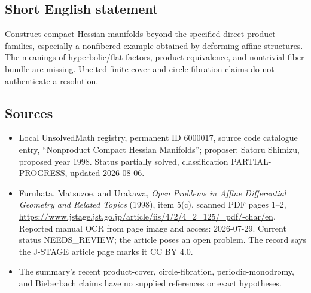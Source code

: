 \documentclass[11pt]{article}
\begin{document}
\subsection{Short English statement}
Construct compact Hessian manifolds beyond the specified direct-product families, especially a nonfibered example obtained by deforming affine structures. The meanings of hyperbolic/flat factors, product equivalence, and nontrivial fiber bundle are missing. Uncited finite-cover and circle-fibration claims do not authenticate a resolution.
\subsection{Sources}
\begin{itemize}
\item Local UnsolvedMath registry, permanent ID 6000017, source code catalogue entry, ``Nonproduct Compact Hessian Manifolds''; proposer: Satoru Shimizu, proposed year 1998. Status partially solved, classification PARTIAL-PROGRESS, updated 2026-08-06.
\item Furuhata, Matsuzoe, and Urakawa, \emph{Open Problems in Affine Differential Geometry and Related Topics} (1998), item 5(c), scanned PDF pages 1--2, \url{https://www.jstage.jst.go.jp/article/iis/4/2/4_2_125/_pdf/-char/en}. Reported manual OCR from page image and access: 2026-07-29. Current status NEEDS\_REVIEW; the article poses an open problem. The record says the J-STAGE article page marks it CC BY 4.0.
\item The summary's recent product-cover, circle-fibration, periodic-monodromy, and Bieberbach claims have no supplied references or exact hypotheses.
\end{itemize}
\end{document}
